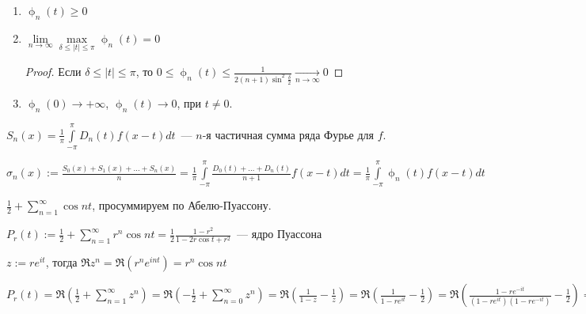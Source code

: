 \begin{example}
\begin{properties}
\begin{enumerate}
\begin{proof}
                      $\sum\limits_{k = 0}^n2\sin(n + \frac{1}{2})t\sin \frac{t}{2} = 4\sin^2\frac{t}{2} \sum\limits_{k = 0}^nD_k(t)$
                  \end{proof}
            \item $\upphi_n(t) \geq 0$
            \item $\lim\limits_{n \to \infty} \max\limits_{\delta \leq |t| \leq \pi} \upphi_n(t) = 0$
                  \begin{proof}
                      Если $\delta \leq |t| \leq \pi$, то $0 \leq \upphi_n(t) \leq \frac{1}{2(n + 1)\sin^2\frac{\delta}{2}} \xrightarrow[n \to \infty]{} 0$
                  \end{proof}
            \item $\upphi_n(0) \to +\infty$, $\upphi_n(t) \to 0$, при $t \neq 0$.
        \end{enumerate}
    \end{properties}
\end{example}

\leavevmode


$S_n(x) = \frac{1}{\pi}\int\limits_{-\pi}^{\pi}D_n(t)f(x - t)dt$~--- $n$-я частичная сумма ряда Фурье для $f$.

$\sigma_n(x) := \frac{S_0(x) + S_1(x) + \ldots + S_n(x)}{n} = \frac{1}{\pi}\int\limits_{-\pi}^{\pi} \frac{D_0(t) + \ldots + D_n(t)}{n + 1}f(x - t) dt = \frac{1}{\pi} \int\limits_{-\pi}^{\pi}\upphi_n(t)f(x - t)dt$


\begin{example}
    $\frac{1}{2} + \sum\limits_{n = 1}^\infty \cos nt$, просуммируем по Абелю-Пуассону.
    
    $P_r(t) := \frac{1}{2} + \sum\limits_{n = 1}^\infty r^n \cos nt = \frac{1}{2} \frac{1 - r^2}{1 - 2r\cos t + r^2}$~--- ядро Пуассона
    
    $z := re^{it}$, тогда $\Re z^n = \Re(r^ne^{int}) = r^n \cos nt$
    
    $P_r(t) = \Re(\frac{1}{2} + \sum\limits_{n =1}^\infty z^n) = \Re(-\frac{1}{2} + \sum\limits_{n = 0}^\infty z^n) = \Re(\frac{1}{1 - z} - \frac{1}{z}) = \Re(\frac{1}{1 - re^{it}} - \frac{1}{2}) = \Re(\frac{1 - re^{-it}}{(1 - re^{it})(1 - re^{-it})} - \frac{1}{2}) = \frac{1 -r \cos t}{1 + r^2-r(e^{it} + e^{-it})} - \frac{1}{2} = \frac{1 -r\cos t}{1 - 2 \cos t r + r^2} - \frac{1}{2}$
\end{example}


